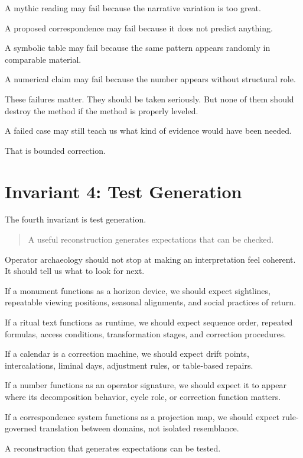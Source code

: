 \documentclass[11pt]{book}
\begin{document}
A mythic reading may fail because the narrative variation is too great.

A proposed correspondence may fail because it does not predict anything.

A symbolic table may fail because the same pattern appears randomly in comparable material.

A numerical claim may fail because the number appears without structural role.

These failures matter. They should be taken seriously. But none of them should destroy the method if the method is properly leveled.

A failed case may still teach us what kind of evidence would have been needed.

That is bounded correction.

\section{Invariant 4: Test Generation}

The fourth invariant is test generation.

\begin{quote}
A useful reconstruction generates expectations that can be checked.
\end{quote}

Operator archaeology should not stop at making an interpretation feel coherent. It should tell us what to look for next.

If a monument functions as a horizon device, we should expect sightlines, repeatable viewing positions, seasonal alignments, and social practices of return.

If a ritual text functions as runtime, we should expect sequence order, repeated formulas, access conditions, transformation stages, and correction procedures.

If a calendar is a correction machine, we should expect drift points, intercalations, liminal days, adjustment rules, or table-based repairs.

If a number functions as an operator signature, we should expect it to appear where its decomposition behavior, cycle role, or correction function matters.

If a correspondence system functions as a projection map, we should expect rule-governed translation between domains, not isolated resemblance.

A reconstruction that generates expectations can be tested.
\end{document}
